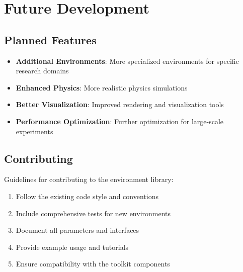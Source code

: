 \section{Future Development}

\subsection{Planned Features}

\begin{itemize}
    \item \textbf{Additional Environments}: More specialized environments for specific research domains
    \item \textbf{Enhanced Physics}: More realistic physics simulations
    \item \textbf{Better Visualization}: Improved rendering and visualization tools
    \item \textbf{Performance Optimization}: Further optimization for large-scale experiments
\end{itemize}

\subsection{Contributing}

Guidelines for contributing to the environment library:

\begin{enumerate}
    \item Follow the existing code style and conventions
    \item Include comprehensive tests for new environments
    \item Document all parameters and interfaces
    \item Provide example usage and tutorials
    \item Ensure compatibility with the toolkit components
\end{enumerate} 